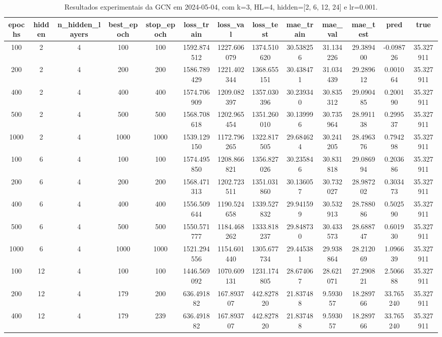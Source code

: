 \begin{table}[h]
\centering
\caption{Resultados experimentais da GCN em 2024-05-04, com k=3, HL=4, hidden=[2, 6, 12, 24] e lr=0.001.}
\label{tab:gcn_results_k3_hl4_d20240504}
\begin{tabular}{ccccccccccccc}
\toprule
epochs & hidden & n\_hidden\_layers & best\_epoch & stop\_epoch & loss\_train & loss\_val & loss\_test & mae\_train & mae\_val & mae\_test & pred & true \\
\midrule
100 & 2 & 4 & 100 & 100 & 1592.874512 & 1227.606079 & 1374.510620 & 30.538256 & 31.134226 & 29.389400 & -0.098726 & 35.327911 \\
200 & 2 & 4 & 200 & 200 & 1586.789429 & 1221.402344 & 1368.655151 & 30.438471 & 31.034439 & 29.289612 & 0.001064 & 35.327911 \\
400 & 2 & 4 & 400 & 400 & 1574.706909 & 1209.082397 & 1357.030396 & 30.239340 & 30.835312 & 29.090485 & 0.200190 & 35.327911 \\
500 & 2 & 4 & 500 & 500 & 1568.708618 & 1202.965454 & 1351.260010 & 30.139996 & 30.735964 & 28.991138 & 0.299537 & 35.327911 \\
1000 & 2 & 4 & 1000 & 1000 & 1539.129150 & 1172.796265 & 1322.817505 & 29.684624 & 30.241205 & 28.496376 & 0.794298 & 35.327911 \\
100 & 6 & 4 & 100 & 100 & 1574.495850 & 1208.866821 & 1356.827026 & 30.235846 & 30.831818 & 29.086994 & 0.203686 & 35.327911 \\
200 & 6 & 4 & 200 & 200 & 1568.471313 & 1202.723511 & 1351.031860 & 30.136057 & 30.732027 & 28.987202 & 0.303473 & 35.327911 \\
400 & 6 & 4 & 400 & 400 & 1556.509644 & 1190.524658 & 1339.527832 & 29.941599 & 30.532913 & 28.788086 & 0.502590 & 35.327911 \\
500 & 6 & 4 & 500 & 500 & 1550.571777 & 1184.468262 & 1333.818237 & 29.848730 & 30.433573 & 28.688747 & 0.601930 & 35.327911 \\
1000 & 6 & 4 & 1000 & 1000 & 1521.294556 & 1154.601440 & 1305.677734 & 29.445381 & 29.938864 & 28.212069 & 1.096639 & 35.327911 \\
100 & 12 & 4 & 100 & 100 & 1446.569092 & 1070.609131 & 1231.174805 & 28.674067 & 28.621071 & 27.290821 & 2.506688 & 35.327911 \\
200 & 12 & 4 & 179 & 200 & 636.491882 & 167.893707 & 442.827820 & 21.837488 & 9.593057 & 18.289766 & 33.765240 & 35.327911 \\
400 & 12 & 4 & 179 & 239 & 636.491882 & 167.893707 & 442.827820 & 21.837488 & 9.593057 & 18.289766 & 33.765240 & 35.327911 \\

\end{tabular}
\end{table}
